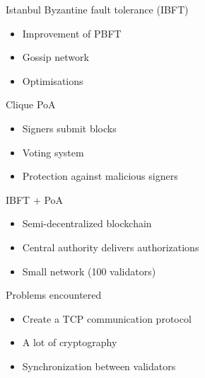 \documentclass[12pt]{beamer}
\begin{document}
  \begin{frame}{Istanbul Byzantine fault tolerance (IBFT)}
    \begin{itemize}
      \item Improvement of PBFT
      \pause
      \item Gossip network
      \pause
      \item Optimisations
    \end{itemize}
  \end{frame}

  \begin{frame}{Clique PoA}
    \begin{itemize}
      \item Signers submit blocks
      \pause
      \item Voting system
      \pause
      \item Protection against malicious signers
    \end{itemize}
  \end{frame}

  \begin{frame}{IBFT + PoA}
    \begin{itemize}
      \item Semi-decentralized blockchain
      \pause
      \item Central authority delivers authorizations
      \pause
      \item Small network (100 validators)
    \end{itemize}
  \end{frame}

  \begin{frame}{Problems encountered}
    \begin{itemize}
      \item Create a TCP communication protocol
      \pause
      \item A lot of cryptography
      \pause
      \item Synchronization between validators
    \end{itemize}

  \end{frame}
\end{document}
